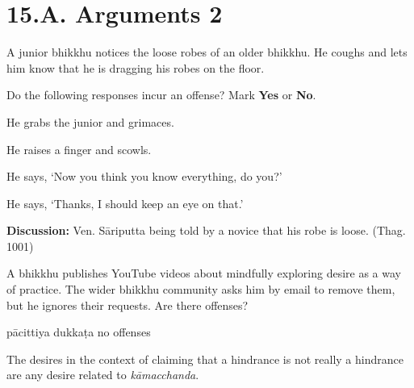 \chapter{15.A. Arguments 2}
\renewcommand*{\theChapterTitle}{15.A. Arguments 2}

\begin{exam}{\autoExamName}

  \begin{problem*}

    A junior bhikkhu notices the loose robes of an older bhikkhu.
    He coughs and lets him know that he is dragging his robes on the floor.

    \bigskip

    Do the following responses incur an offense? Mark \textbf{Yes} or \textbf{No}.

    \bigskip

      \begin{parts}

      \item {} He grabs the junior and grimaces.
      \item {} He raises a finger and scowls.
      \item {} He says, `Now you think you know everything, do you?'
      \item {} He says, `Thanks, I should keep an eye on that.'

      \end{parts}

    \bigskip

    \textbf{Discussion:} Ven. Sāriputta being told by a novice that his robe is loose. (Thag. 1001)
    
  \end{problem*}

  \problemDivide

  \begin{problem}

  A bhikkhu publishes YouTube videos about mindfully exploring desire as a way
  of practice. The wider bhikkhu community asks him by email to remove them, but
  he ignores their requests. Are there offenses?

  \bigskip

  \begin{answers}{3}
    \bChoices
     pācittiya\eAns
     dukkaṭa\eAns
     no offenses\eAns
    \eChoices
  \end{answers}

  \begin{solution}
    The desires in the context of claiming that a hindrance is not really a
    hindrance are any desire related to \emph{kāmacchanda}.


\end{solution}
\end{problem}
\end{exam}
